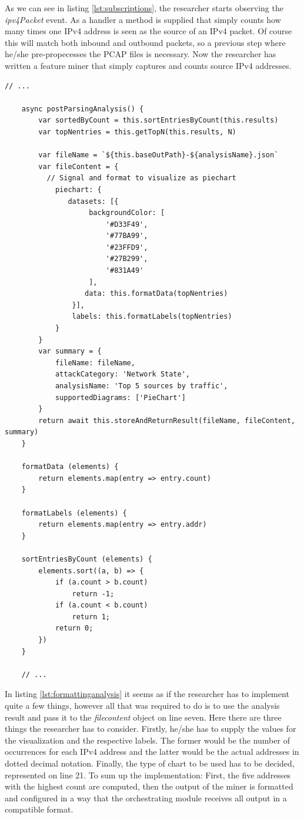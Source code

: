 As we can see in listing \ref{lst:subscriptions}, the researcher starts observing the \textit{ipv4Packet} event. As a handler a method is supplied that simply counts how many times one IPv4 address is seen as the source of an IPv4 packet. Of course this will match both inbound and outbound packets, so a previous step where he/she pre-propecesses the PCAP files is necessary. Now the researcher has written a feature miner that simply captures and counts source IPv4 addresses.

\begin{lstlisting}[caption={Initial content of the newly create Miner},label={lst:formattinganalysis}]
    // ...
    
    async postParsingAnalysis() {
        var sortedByCount = this.sortEntriesByCount(this.results)
        var topNentries = this.getTopN(this.results, N)
 
        var fileName = `${this.baseOutPath}-${analysisName}.json`
        var fileContent = {
          // Signal and format to visualize as piechart
            piechart: {
               datasets: [{
                    backgroundColor: [
                        '#D33F49',
                        '#77BA99',
                        '#23FFD9',
                        '#27B299',
                        '#831A49'
                    ],
                   data: this.formatData(topNentries)
                }],
                labels: this.formatLabels(topNentries)
            }
        }
        var summary = {
            fileName: fileName,
            attackCategory: 'Network State',
            analysisName: 'Top 5 sources by traffic',
            supportedDiagrams: ['PieChart']
        }
        return await this.storeAndReturnResult(fileName, fileContent, summary)
    }
 
    formatData (elements) {
        return elements.map(entry => entry.count)
    }
 
    formatLabels (elements) {
        return elements.map(entry => entry.addr)
    }
  
    sortEntriesByCount (elements) {
        elements.sort((a, b) => {
            if (a.count > b.count)
                return -1;
            if (a.count < b.count)
                return 1;
            return 0;
        })
    }
    
    // ...

\end{lstlisting}
In listing \ref{lst:formattinganalysis} it seems as if the researcher has to implement quite a few things, however all that was required to do is to use the analysis result and pass it to the \textit{filecontent} object on line seven. Here there are three things the researcher has to consider. Firstly, he/she has to supply the values for the visualization and the respective labels. The former would be the number of occurrences for each IPv4 address and the latter would be the actual addresses in dotted decimal notation. Finally, the type of chart to be used has to be decided, represented on line 21. To sum up the implementation: First, the five addresses with the highest count are computed, then the output of the miner is formatted and configured in a way that the orchestrating module receives all output in a compatible format.
